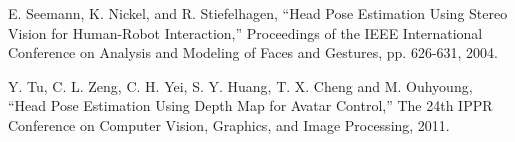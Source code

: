 \begin{thebibliography}{}
E. Seemann, K. Nickel, and R. Stiefelhagen, “Head Pose Estimation Using Stereo Vision for Human-Robot Interaction,” Proceedings of the IEEE International Conference on Analysis and Modeling of Faces and Gestures, pp. 626-631, 2004.

Y. Tu, C. L. Zeng, C. H. Yei, S. Y. Huang, T. X. Cheng and M. Ouhyoung, “Head Pose Estimation Using Depth Map for Avatar Control,” The 24th IPPR Conference on Computer Vision, Graphics, and Image Processing, 2011. 



\end{thebibliography}



